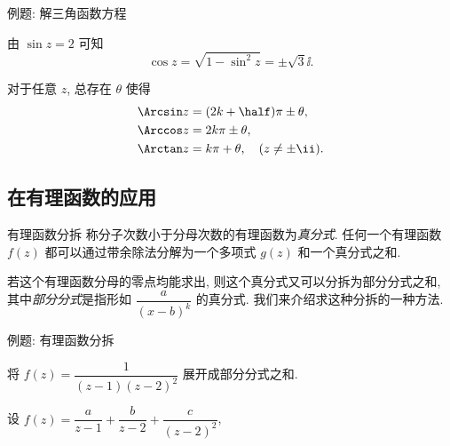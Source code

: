 \begin{frame}{例题: 解三角函数方程}
	\onslide<+->
	\begin{solution}[][另解]
	由 $\sin z=2$ 可知
	\[
		\cos z=\sqrt{1-\sin^2 z}=\pm\sqrt 3\ii.
	\]
	\onslide<+->{%
		\[
			z=-\ii \Ln[(2\pm\sqrt 3)\ii]=\Bigl(2k+\half\Bigr)\pi\pm \ii\ln(2+\sqrt3),\quad k\in\BZ.
		\]
	}\bigdel
	\end{solution}
	\onslide<+->
	对于任意 $z$, 总存在 $\theta$ 使得
	\begin{align*}
		\Arcsin z&=(2k+\half)\pi\pm \theta,\\
		\Arccos z&=2k\pi\pm \theta,\\
		\Arctan z&=k\pi+\theta,\quad (z\ne\pm\ii).
	\end{align*}
\end{frame}


\subsection{在有理函数的应用}


\begin{frame}{有理函数分拆}
	\onslide<+->
	称分子次数小于分母次数的有理函数为\emph{真分式}.
	\onslide<+->
	任何一个有理函数 $f(z)$ 都可以通过带余除法分解为一个多项式 $g(z)$ 和一个真分式之和.

	\onslide<+->
	若这个有理函数分母的零点均能求出, 则这个真分式又可以分拆为部分分式之和, 其中\emph{部分分式}是指形如 $\dfrac{a}{(x-b)^k}$ 的真分式.
	\onslide<+->
	我们来介绍求这种分拆的一种方法.
\end{frame}


\begin{frame}{例题: 有理函数分拆}
	\beqskip{2pt}
	\onslide<+->
	\begin{example}[near]
		将 $f(z)=\dfrac{1}{(z-1)(z-2)^2}$ 展开成部分分式之和.
	\end{example}
	\onslide<+->
	\begin{solution}[near]
		设 $f(z)=\dfrac{a}{z-1}+\dfrac{b}{z-2}+\dfrac{c}{(z-2)^2}$,
		\bigdel
	\end{solution}
	\endgroup
\end{frame}


